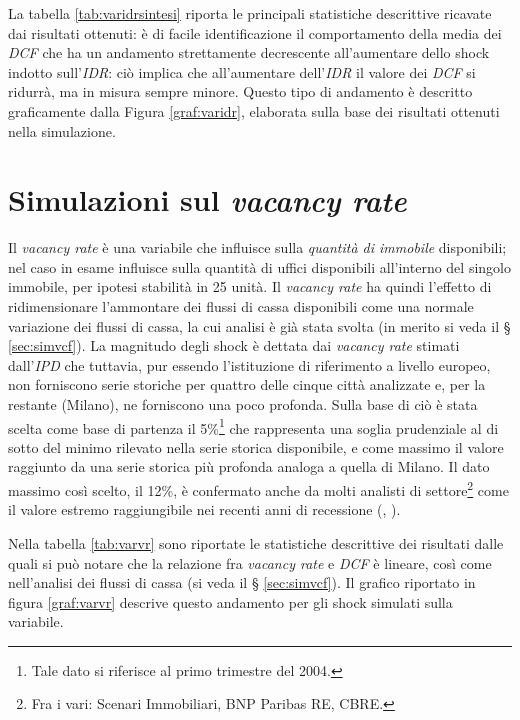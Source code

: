 La tabella \ref{tab:varidrsintesi} riporta le principali statistiche descrittive ricavate dai risultati ottenuti: è di facile identificazione il comportamento della media dei \textit{DCF} che ha un andamento strettamente decrescente all'aumentare dello shock indotto sull'\textit{IDR}: ciò implica che all'aumentare dell'\textit{IDR} il valore dei \textit{DCF} si ridurrà, ma in misura sempre minore. Questo tipo di andamento è descritto graficamente dalla Figura \ref{graf:varidr}, elaborata sulla base dei risultati ottenuti nella simulazione.



\section{Simulazioni sul \textit{vacancy rate}}
Il {\itshape vacancy rate} è una variabile che influisce sulla {\itshape quantità di immobile} disponibili; nel caso in esame influisce sulla quantità di uffici disponibili all'interno del singolo immobile, per ipotesi stabilità in 25 unità. Il {\itshape vacancy rate} ha quindi l'effetto di ridimensionare l'ammontare dei flussi di cassa disponibili come una normale variazione dei flussi di cassa, la cui analisi è già stata svolta (in merito si veda il § \ref{sec:simvcf}).
La magnitudo degli shock è dettata dai {\itshape vacancy rate} stimati dall'\textit{IPD} che tuttavia, pur essendo l'istituzione di riferimento a livello europeo, non forniscono serie storiche per quattro delle cinque città analizzate e, per la restante (Milano), ne forniscono una poco profonda. Sulla base di ciò è stata scelta come base di partenza il 5\%\footnote{Tale dato si riferisce al primo trimestre del 2004.} che rappresenta una soglia prudenziale al di sotto del minimo rilevato nella serie storica disponibile, e come massimo il valore raggiunto da una serie  storica più profonda analoga a quella di Milano. Il dato massimo così scelto, il 12\%, è confermato anche da molti analisti di settore\footnote{Fra i vari: Scenari Immobiliari, BNP Paribas RE, CBRE.} come il valore estremo raggiungibile nei recenti anni di recessione (\cite{ilsolevacancy}, \cite[p. 3]{cbrevacancy}).



Nella tabella \ref{tab:varvr} sono riportate le statistiche descrittive dei risultati dalle quali si può notare che la relazione fra {\itshape vacancy rate} e \textit{DCF} è lineare, così come nell'analisi dei flussi di cassa (si veda il § \ref{sec:simvcf}). Il grafico riportato in figura \ref{graf:varvr} descrive questo andamento per gli shock simulati sulla variabile.


